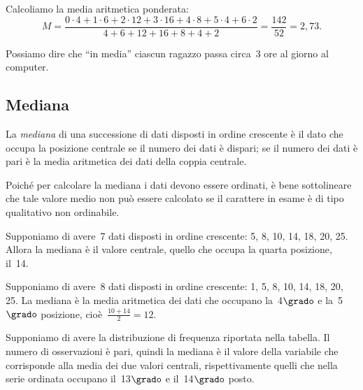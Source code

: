 \begin{esempio}
\begin{esempio}
Calcoliamo la media aritmetica ponderata:
\begin{equation*}
M=\frac{0\cdot 4+1\cdot 6+2\cdot 12+3\cdot 16+4\cdot 8+5\cdot 4+6\cdot 
2}{4+6+12+16+8+4+2}=\frac{142}{52}=2,73.
\end{equation*}

Possiamo dire che ``in media'' ciascun ragazzo passa circa~3 ore al giorno 
al computer.
\end{esempio}

\subsection{Mediana}
\label{subsec:stat02_mediana}

\begin{definizione}
La \emph{mediana} di una successione di dati disposti in ordine crescente è 
il dato che occupa la
posizione centrale se il numero dei dati è dispari; se il numero dei dati è 
pari è la media aritmetica dei dati della coppia centrale.
\end{definizione}

Poiché per calcolare la mediana i dati devono essere ordinati, è bene 
sottolineare che tale valore medio non può essere calcolato se il carattere
in esame è di tipo qualitativo non ordinabile.

\begin{esempio}
Supponiamo di avere~7 dati disposti in ordine crescente: 5, 8, 10, 14, 18, 
20, 25.
Allora la mediana è il valore centrale, quello che occupa la quarta 
posizione, il~14.
\end{esempio}

\begin{esempio}
Supponiamo di avere~8 dati disposti in ordine crescente: 1, 5, 8, 10, 14, 
18, 20, 25.
La mediana è la media aritmetica dei dati che occupano la~4\(\grado\) e 
la~5\(\grado\) posizione, cioè~\(\frac{10+14}{2}=12\).
\end{esempio}

\begin{esempio}
Supponiamo di avere la distribuzione di frequenza riportata nella tabella.
Il numero di osservazioni è pari, quindi la mediana è il valore della 
variabile che corrisponde alla media dei due
valori centrali, rispettivamente quelli che nella serie ordinata occupano 
il~13\(\grado\) e il~14\(\grado\) posto.


\end{esempio}
\end{esempio}
